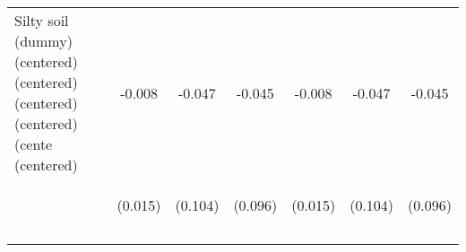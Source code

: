 \begin{center}
\begin{tabular}{lcccccc}
Silty soil (dummy) (centered) (centered) (centered) (centered) (cente (centered) & -0.008 & -0.047 & -0.045 & -0.008 & -0.047 & -0.045 \\
 & \begin{footnotesize}(0.015)\end{footnotesize} & \begin{footnotesize}(0.104)\end{footnotesize} & \begin{footnotesize}(0.096)\end{footnotesize} & \begin{footnotesize}(0.015)\end{footnotesize} & \begin{footnotesize}(0.104)\end{footnotesize} & \begin{footnotesize}(0.096)\end{footnotesize} \\
 & \begin{footnotesize}[0.608]\end{footnotesize} & \begin{footnotesize}[0.656]\end{footnotesize} & \begin{footnotesize}[0.641]\end{footnotesize} & \begin{footnotesize}[0.608]\end{footnotesize} & \begin{footnotesize}[0.656]\end{footnotesize} & \begin{footnotesize}[0.641]\end{footnotesize} \\
\vspace{4pt} & \begin{footnotesize}\end{footnotesize} & \begin{footnotesize}\end{footnotesize} & \begin{footnotesize}\end{footnotesize} & \begin{footnotesize}\end{footnotesize} & \begin{footnotesize}\end{footnotesize} & \begin{footnotesize}\end{footnotesize} \\

\end{tabular}
\end{center}
